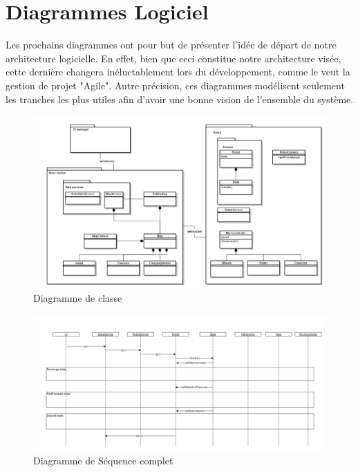 \chapter{Diagrammes Logiciel}
Les prochains diagrammes ont pour but de présenter l'idée de départ de notre architecture logicielle.
En effet, bien que ceci constitue notre architecture visée, cette dernière changera inéluctablement lors du développement, comme le veut la gestion de projet "Agile".
Autre précision, ces diagrammes modélisent seulement les tranches les plus utiles afin d'avoir une bonne vision de l'ensemble du système.

\begin{landscape}
\begin{figure}
  \centering
  \includegraphics[scale=0.5, angle=0]{resources/diagrams/classDiagram.png}
  \caption{Diagramme de classe}
\end{figure}

\begin{figure}
  \centering
  \includegraphics[scale=0.45, angle=0]{resources/diagrams/sequenceDiagram.png}
  \caption{Diagramme de Séquence complet}
\end{figure}


\end{landscape}

